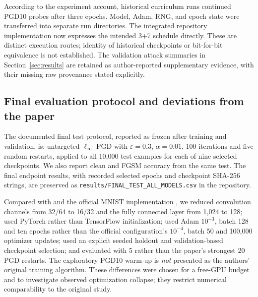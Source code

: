 \documentclass[11pt,a4paper]{article}
\newif\ifshowguides
\newcommand{\guide}[1]{%
  \ifshowguides
  \par\medskip\noindent
  \fcolorbox{guideframe}{guidebg}{%
    \begin{minipage}{\dimexpr\linewidth-2\fboxsep-2\fboxrule\relax}
      \small\textbf{Guide.}
      \begin{itemize}[leftmargin=1.2em,itemsep=1pt,topsep=2pt]
        #1
      \end{itemize}
    \end{minipage}}%
  \par\medskip
  \fi}
\newcommand{\linf}{\ell_\infty}
\begin{document}
According to the experiment account, historical curriculum runs continued PGD10 probes after three epochs. Model, Adam, RNG, and epoch state were transferred into separate run directories. The integrated repository implementation now expresses the intended 3+7 schedule directly. These are distinct execution routes; identity of historical checkpoints or bit-for-bit equivalence is not established. The validation attack summaries in Section~\ref{sec:results} are retained as author-reported supplementary evidence, with their missing raw provenance stated explicitly.

\subsection{Final evaluation protocol and deviations from the paper}
The documented final test protocol, reported as frozen after training and validation, is: untargeted $\linf$ PGD with $\varepsilon=0.3$, $\alpha=0.01$, 100 iterations and five random restarts, applied to all 10,000 test examples for each of nine selected checkpoints. We also report clean and FGSM accuracy from the same test. The final endpoint results, with recorded selected epochs and checkpoint SHA-256 strings, are preserved as \texttt{results/FINAL\_TEST\_ALL\_MODELS.csv} in the repository.

Compared with \citet{madry2018towards} and the official MNIST implementation \citep{madrylab_mnist_challenge}, we reduced convolution channels from 32/64 to 16/32 and the fully connected layer from 1,024 to 128; used PyTorch rather than TensorFlow initialization; used Adam $10^{-3}$, batch 128 and ten epochs rather than the official configuration's $10^{-4}$, batch 50 and 100,000 optimizer updates; used an explicit seeded holdout and validation-based checkpoint selection; and evaluated with 5 rather than the paper's strongest 20 PGD restarts. The exploratory PGD10 warm-up is \emph{not} presented as the authors' original training algorithm. These differences were chosen for a free-GPU budget and to investigate observed optimization collapse; they restrict numerical comparability to the original study.


\guide{
  \item Another student should be able to repeat your experiments from this section and your code alone.
  \item Report every hyperparameter, including the ones you left at library defaults.
  \item Run each configuration with at least 3 different random seeds.
  \item List every deviation from the original paper (smaller dataset, fewer epochs, different architecture, \dots) and explain why you made it and how it might affect the result.
  \item Say how hyperparameters were chosen. Choosing them on the test set is not acceptable.
}
\end{document}
